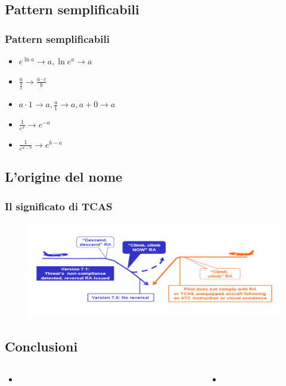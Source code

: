 \documentclass[aspectratio=149]{beamer}
\begin{document}
	\subsection{Pattern semplificabili}
	\begin{frame}
		\frametitle{Pattern semplificabili}
		\begin{itemize}
			\pause \item \(e^{\ln{a}} \rightarrow a, \ln{e^{a}} \rightarrow a\)
			\pause \item \(\frac{a}{\frac{b}{c}} \rightarrow \frac{a \cdot c}{b}\)
			\pause \item \(a \cdot 1 \rightarrow a, \frac{a}{1} \rightarrow a, a + 0 \rightarrow a\)
			\pause \item \(\frac{1}{e^{x}} \rightarrow e^{-a}\)
			\pause \item \(\frac{1}{e^{a - b}} \rightarrow e^{b - a}\)
		\end{itemize}
	\end{frame}
	
	\subsection{L'origine del nome}
	\begin{frame}
		\frametitle{Il significato di TCAS}
		\begin{figure}
			\includegraphics[width=1.0\textwidth]{pres_img/tcas.png}
		\end{figure}
	\end{frame}

	\subsection{Conclusioni}
	\begin{frame}
		\begin{columns}
			\begin{column}{0.45\textwidth}
				\begin{itemize}
					\item 
				\end{itemize}
			\end{column}
			\begin{column}{0.1\textwidth}
			\end{column}
			\begin{column}{0.45\textwidth}
				\begin{itemize}
					\item 
				\end{itemize}
			\end{column}
		\end{columns}
	\end{frame}
	
\end{document}
